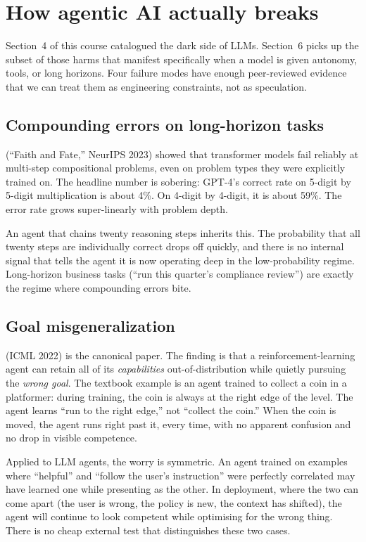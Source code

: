 \documentclass[11pt]{article}
\begin{document}
\section{How agentic AI actually breaks}

Section~4 of this course catalogued the dark side of LLMs. Section~6
picks up the subset of those harms that manifest specifically when a
model is given autonomy, tools, or long horizons. Four failure modes
have enough peer-reviewed evidence that we can treat them as
engineering constraints, not as speculation.

\subsection{Compounding errors on long-horizon tasks}

\citet{dziri2023faith} (``Faith and Fate,'' NeurIPS 2023) showed that
transformer models fail reliably at multi-step compositional
problems, even on problem types they were explicitly trained on. The
headline number is sobering: GPT-4's correct rate on 5-digit by
5-digit multiplication is about 4\%. On 4-digit by 4-digit, it is
about 59\%. The error rate grows super-linearly with problem depth.

An agent that chains twenty reasoning steps inherits this. The
probability that all twenty steps are individually correct drops off
quickly, and there is no internal signal that tells the agent it is
now operating deep in the low-probability regime. Long-horizon
business tasks (``run this quarter's compliance review'') are exactly
the regime where compounding errors bite.

\subsection{Goal misgeneralization}

\citet{langosco2022goal} (ICML 2022) is the canonical paper. The
finding is that a reinforcement-learning agent can retain all of its
\emph{capabilities} out-of-distribution while quietly pursuing the
\emph{wrong goal}. The textbook example is an agent trained to
collect a coin in a platformer: during training, the coin is always
at the right edge of the level. The agent learns ``run to the right
edge,'' not ``collect the coin.'' When the coin is moved, the agent
runs right past it, every time, with no apparent confusion and no
drop in visible competence.

Applied to LLM agents, the worry is symmetric. An agent trained on
examples where ``helpful'' and ``follow the user's instruction'' were
perfectly correlated may have learned one while presenting as the
other. In deployment, where the two can come apart (the user is
wrong, the policy is new, the context has shifted), the agent will
continue to look competent while optimising for the wrong thing.
There is no cheap external test that distinguishes these two cases.
\end{document}
